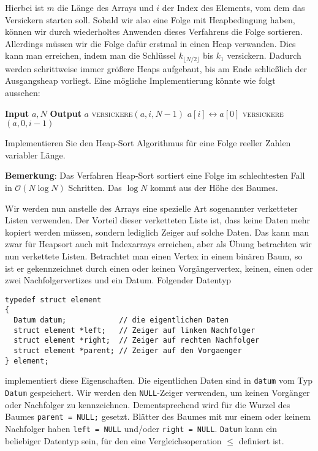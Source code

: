 \documentclass[tikz,12pt]{article}
\begin{document}
Hierbei ist $m$ die Länge des Arrays und $i$ der Index des Elements, vom dem das Versickern starten soll.
Sobald wir also eine Folge mit Heapbedingung haben, können wir durch wiederholtes Anwenden dieses Verfahrens die Folge sortieren.
Allerdings müssen wir die Folge dafür erstmal in einen Heap verwanden. 
Dies kann man erreichen, indem man die Schlüssel $k_{\lfloor N/2\rfloor}$ bis $k_1$ versickern. 
Dadurch werden schrittweise immer größere Heaps aufgebaut, bis am Ende schließlich der Ausgangsheap vorliegt. 
Eine mögliche Implementierung könnte wie folgt aussehen:
\begin{algorithmic}[1]
  \State \textbf{Input} $a,N$
  \State \textbf{Output} $a$
  \State \textsc{versickere}$(a, i, N-1)$
  \EndFor
  \State $a[i]\leftrightarrow a[0]$
  \State \textsc{versickere}$(a, 0, i-1)$
  \EndFor
  \EndProcedure
\end{algorithmic}
Implementieren Sie den Heap-Sort Algorithmus für eine Folge reeller Zahlen variabler Länge.

\textbf{Bemerkung}: Das Verfahren Heap-Sort sortiert eine Folge im schlechtesten Fall in $\mathcal{O}(N\log N)$ Schritten.
Das $\log N$ kommt aus der Höhe des Baumes.

Wir werden nun anstelle des Arrays eine spezielle Art sogenannter verketteter Listen verwenden.
Der Vorteil dieser verketteten Liste ist, dass keine Daten mehr kopiert werden müssen, sondern lediglich Zeiger auf solche Daten.
Das kann man zwar für Heapsort auch mit Indexarrays erreichen, aber als Übung betrachten wir nun verkettete Listen.
Betrachtet man einen Vertex in einem binären Baum, so ist er gekennzeichnet durch einen oder keinen Vorgängervertex, keinen, einen oder zwei Nachfolgervertizes und ein Datum.
Folgender Datentyp 
\begin{lstlisting}
typedef struct element
{
  Datum datum;            // die eigentlichen Daten
  struct element *left;   // Zeiger auf linken Nachfolger
  struct element *right;  // Zeiger auf rechten Nachfolger
  struct element *parent; // Zeiger auf den Vorgaenger
} element;
\end{lstlisting}
implementiert diese Eigenschaften.
Die eigentlichen Daten sind in \texttt{datum} vom Typ \texttt{Datum} gespeichert.
Wir werden den \texttt{NULL}-Zeiger verwenden, um keinen Vorgänger oder Nachfolger zu kennzeichnen.
Dementsprechend wird für die Wurzel des Baumes \texttt{parent = NULL;} gesetzt.
Blätter des Baumes mit nur einem oder keinem Nachfolger haben \texttt{left = NULL} und/oder \texttt{right = NULL}.
\texttt{Datum} kann ein beliebiger Datentyp sein, für den eine Vergleichsoperation $\leq$ definiert ist.
\end{document}
